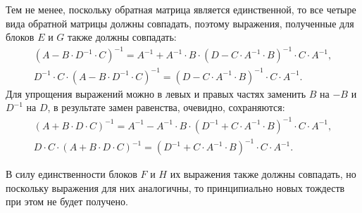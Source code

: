 Тем не менее, поскольку обратная матрица является единственной, то все четыре вида обратной матрицы должны совпадать, поэтому выражения, полученные для блоков
$E$ и $G$ также должны совпадать:
\begin{gather*}
	\left ( A - B \cdot D^{-1} \cdot C \right )^{-1} = A^{-1} + A^{-1} \cdot B \cdot \left ( D - C \cdot A^{-1} \cdot B \right )^{-1} \cdot C \cdot A^{-1} , \\
	D^{-1} \cdot C \cdot \left ( A - B \cdot D^{-1} \cdot C \right )^{-1} = \left ( D - C \cdot A^{-1} \cdot B \right )^{-1} \cdot C \cdot A^{-1} .
\end{gather*}
Для упрощения выражений можно в левых и правых частях заменить $B$ на $-B$ и $D^{-1}$ на $D$, в результате замен равенства, очевидно, сохраняются:
\begin{gather}
	\left ( A + B \cdot D \cdot C \right )^{-1} = A^{-1} - A^{-1} \cdot B \cdot \left ( D^{-1} + C \cdot A^{-1} \cdot B \right )^{-1} \cdot C \cdot A^{-1} ,
		\label{equation:filtering:appendix:inversions:first} \\
	D \cdot C \cdot \left ( A + B \cdot D \cdot C \right )^{-1} = \left ( D^{-1} + C \cdot A^{-1} \cdot B \right )^{-1} \cdot C \cdot A^{-1}
		\label{equation:filtering:appendix:inversions:second}.
\end{gather}

В силу единственности блоков $F$ и $H$ их выражения также должны совпадать, но поскольку выражения для них аналогичны, то принципиально новых тождеств при этом
не будет получено.